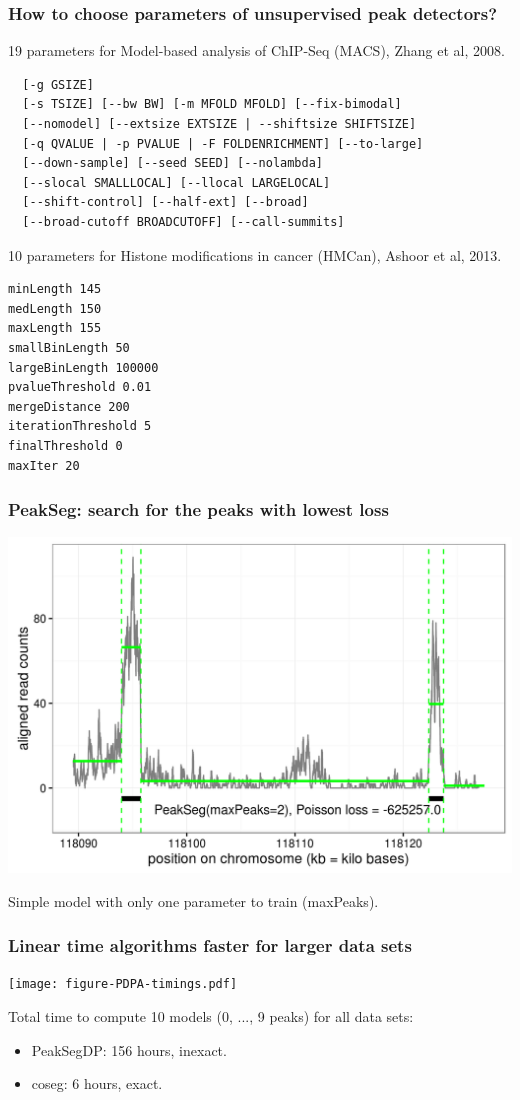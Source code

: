 \documentclass{beamer}
\begin{document}
\begin{frame}[fragile]
  \frametitle{How to choose parameters of unsupervised peak
    detectors?}
\scriptsize
19 parameters for Model-based analysis of ChIP-Seq (MACS), Zhang et al, 2008.
\begin{verbatim}
  [-g GSIZE]
  [-s TSIZE] [--bw BW] [-m MFOLD MFOLD] [--fix-bimodal]
  [--nomodel] [--extsize EXTSIZE | --shiftsize SHIFTSIZE]
  [-q QVALUE | -p PVALUE | -F FOLDENRICHMENT] [--to-large]
  [--down-sample] [--seed SEED] [--nolambda]
  [--slocal SMALLLOCAL] [--llocal LARGELOCAL]
  [--shift-control] [--half-ext] [--broad]
  [--broad-cutoff BROADCUTOFF] [--call-summits]
\end{verbatim}
10 parameters for Histone modifications in cancer (HMCan),
Ashoor et al, 2013.
\begin{verbatim}
minLength 145
medLength 150
maxLength 155
smallBinLength 50
largeBinLength 100000
pvalueThreshold 0.01
mergeDistance 200
iterationThreshold 5
finalThreshold 0
maxIter 20
\end{verbatim}
\end{frame}

\begin{frame}
  \frametitle{PeakSeg: search for the peaks with lowest loss}
  \includegraphics[width=1\textwidth]{figure-macs-problem-PeakSeg.png}
  
  Simple model with only one parameter to train (maxPeaks).
\end{frame}

\begin{frame}
  \frametitle{Linear time algorithms faster for larger data sets}
  \texttt{[image: figure-PDPA-timings.pdf]}

  Total time to compute 10 models (0, ..., 9 peaks) for all data sets:
  \begin{itemize}
  \item PeakSegDP: 156 hours, inexact.
  \item coseg: 6 hours, exact.
  \end{itemize}
\end{frame}
\end{document}
